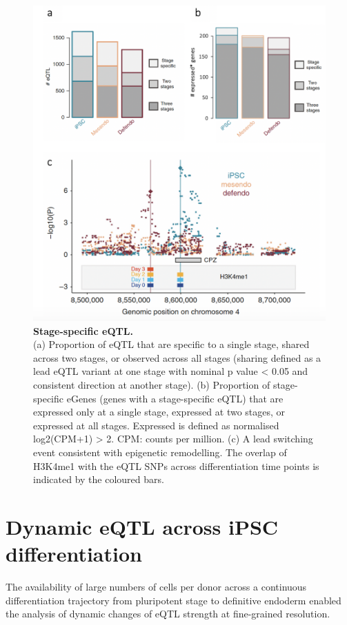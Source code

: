 \begin{figure}[htbp]
\centering
\includegraphics[width=12cm]{Chapter4/Fig/endodiff_stage_specific.png}
\caption[Stage-specific eQTL]{\textbf{Stage-specific eQTL.}\\
(a) Proportion of eQTL that are specific to a single stage, shared across two
stages, or observed across all stages (sharing defined as a lead eQTL variant at one stage with nominal p value < 0.05 and consistent direction
at another stage).
(b) Proportion of stage-specific eGenes (genes with a stage-specific eQTL) that are expressed only at a single stage, expressed at two stages, or expressed at all stages. 
Expressed is defined as normalised log2(CPM+1) > 2. 
CPM: counts per million.
(c) A lead switching event consistent with epigenetic remodelling. 
The overlap of H3K4me1 with the eQTL SNPs across differentiation time points is indicated by the coloured bars.}
\label{fig:endodiff_stage_specific_eqtl}
\end{figure}

\newpage

\section{Dynamic eQTL across iPSC differentiation}
\label{sec:endodiff_dynamic_eqtl}

The availability of large numbers of cells per donor across a continuous differentiation trajectory from pluripotent stage to definitive endoderm enabled the analysis of dynamic changes of eQTL strength at fine-grained resolution. \\

